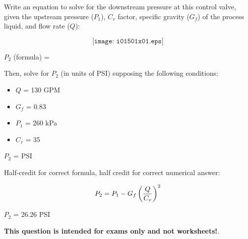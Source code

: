 

Write an equation to solve for the downstream pressure at this control valve, given the upstream pressure ($P_1$), $C_v$ factor, specific gravity ($G_f$) of the process liquid, and flow rate ($Q$):

$$\texttt{[image: i01501x01.eps]}$$

\vskip 10pt

$P_2$ (formula) = 

\vskip 20pt

Then, solve for $P_2$ (in units of PSI) supposing the following conditions:

\begin{itemize}
\item{} $Q$ = 130 GPM
\item{} $G_f$ = 0.83
\item{} $P_1$ = 260 kPa
\item{} $C_v$ = 35
\end{itemize}

\vskip 10pt

$P_2$ = \underbar{\hskip 50pt} PSI







Half-credit for correct formula, half credit for correct numerical answer:

\vskip 10pt

$$P_2 = P_1 - G_f \left( {Q \over C_v} \right)^2$$

\vskip 10pt

$P_2$ = 26.26 PSI







{\bf This question is intended for exams only and not worksheets!}.



